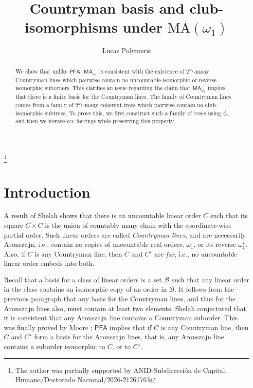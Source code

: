 \documentclass[a4paper,noamsfonts]{amsart}
\theoremstyle{definition}
\newcommand{\PFA}{\textsf{PFA}}
\newcommand{\MA}{\textsf{MA}}
\newcommand{\1}{\mathbbm{1}}
\newcommand{\dia}{\diamondsuit}
\begin{document}
\title[Countryman basis and club-isomorphisms under $\text{MA}(\omega_{1})$]
{Countryman basis and club-isomorphisms
  under $\text{MA}(\omega_{1})$}

\author{Lucas Polymeris}
\address{Department of Mathematics, Universidad de Concepción, Concepción, Chile}


\thanks{The author was partially supported by
  ANID-Subdirección de Capital Humano/Doctorado Nacional/2026-21261763}



\begin{abstract}
  We show that unlike $\PFA$,
  $\MA_{\omega_{1}}$ is consistent with the existence
  of $2^{\omega_{1}}$-many Countryman lines which pairwise contain no
  uncountable isomorphic or reverse-isomorphic suborders.
  This clarifies an issue regarding the claim
  that $\MA_{\omega_{1}}$ implies that there is a finite basis for the Countryman
  lines. The family of Countryman lines comes from
  a family of $2^{\omega_{1}}$-many coherent
  trees which pairwise contain no club-isomorphic subtrees. To prove this,
  we first construct such a family of trees using $\dia$, and then we iterate
  ccc forcings while preserving this property.
\end{abstract}


\maketitle

\section{Introduction}

A result of Shelah \cite{Shelah1976} shows that there is an
uncountable linear order $C$ such that its square $C \times C$ is the
union of countably many chain with the coordinate-wise partial order.
Such linear orders are called \emph{Countryman lines}, and are
necessarily Aronszajn, i.e., contain no copies of uncountable real
orders, $\omega_{1}$, or its reverse $\omega_{1}^{\star}$. Also, if
$C$ is any Countryman line, then $C$ and $C^{\star}$ are
\emph{far}, i.e., no uncountable linear order embeds into both.

Recall that a basis for a class of linear orders is a set
$\mathcal{B}$ such that any linear order in the class contains an
isomorphic copy of an order in $\mathcal{B}$. It follows from
the previous paragraph that any basis
for the Countryman lines, and thus for the Aronszajn lines also, must
contain at least two elements. Shelah \cite{Shelah1976} conjectured
that it is consistent that any Aronszajn line contains a Countryman
suborder. This was finally proved by Moore \cite{5-basis}; $\PFA$
implies that if $C$ is any Countryman line, then $C$ and $C^{\star}$ form
a basis for the Aronszajn lines, that is, any Aronszajn line contains
a suborder isomorphic to $C$, or to $C^{\star}$.
\end{document}
